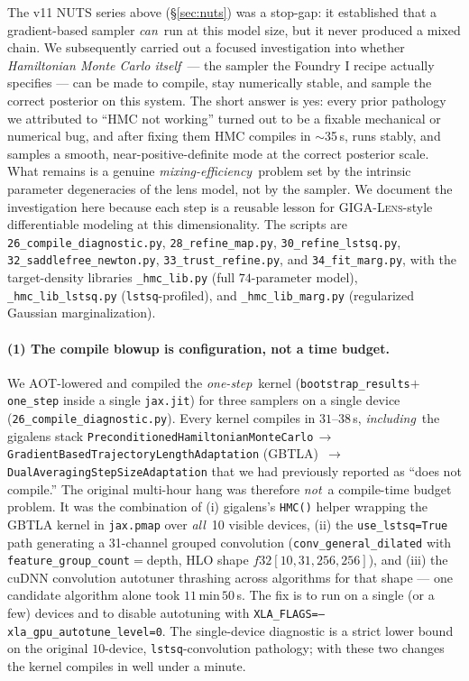 \documentclass[11pt,letterpaper]{article}
\newcommand{\gigalens}{\textsc{GIGA-Lens}}
\begin{document}
The v11 NUTS series above (\S\ref{sec:nuts}) was a stop-gap: it
established that a gradient-based sampler {\it can}\ run at this model
size, but it never produced a mixed chain. We subsequently carried out
a focused investigation into whether {\it Hamiltonian Monte Carlo
itself}\ --- the sampler the Foundry I recipe actually specifies --- can
be made to compile, stay numerically stable, and sample the correct
posterior on this system. The short answer is yes: every prior pathology
we attributed to ``HMC not working'' turned out to be a fixable
mechanical or numerical bug, and after fixing them HMC compiles in
$\sim$35\,s, runs stably, and samples a smooth, near-positive-definite
mode at the correct posterior scale. What remains is a genuine
{\it mixing-efficiency}\ problem set by the intrinsic parameter
degeneracies of the lens model, not by the sampler. We document the
investigation here because each step is a reusable lesson for
\gigalens-style differentiable modeling at this dimensionality. The
scripts are \texttt{26\_compile\_diagnostic.py},
\texttt{28\_refine\_map.py}, \texttt{30\_refine\_lstsq.py},
\texttt{32\_saddlefree\_newton.py}, \texttt{33\_trust\_refine.py}, and
\texttt{34\_fit\_marg.py}, with the target-density libraries
\texttt{\_hmc\_lib.py} (full $74$-parameter model),
\texttt{\_hmc\_lib\_lstsq.py} (\texttt{lstsq}-profiled), and
\texttt{\_hmc\_lib\_marg.py} (regularized Gaussian marginalization).

\paragraph{(1) The compile blowup is configuration, not a time budget.}
We AOT-lowered and compiled the {\it one-step}\ kernel
(\texttt{bootstrap\_results}$+$\texttt{one\_step} inside a single
\texttt{jax.jit}) for three samplers on a single device
(\texttt{26\_compile\_diagnostic.py}). Every kernel compiles in
$31$--$38$\,s, {\it including}\ the gigalens stack
\texttt{Preconditioned\-Hamiltonian\-Monte\-Carlo}$\,\to\,$
\texttt{Gradient\-Based\-Tra\-jec\-tory\-Length\-Adap\-ta\-tion} (GBTLA)
$\,\to\,$\texttt{DualAveragingStepSizeAdaptation} that we had previously
reported as ``does not compile.'' The original multi-hour hang was
therefore {\it not}\ a compile-time budget problem. It was the
combination of (i) gigalens's \texttt{HMC()} helper wrapping the GBTLA
kernel in \texttt{jax.pmap} over {\it all}\ 10 visible devices, (ii) the
\texttt{use\_lstsq=True} path generating a 31-channel grouped
convolution (\texttt{conv\_general\_dilated} with
\texttt{feature\_group\_count}$=$depth, HLO shape
$f32[10,31,256,256]$), and (iii) the cuDNN convolution autotuner
thrashing across algorithms for that shape --- one candidate algorithm
alone took $11$\,min\,$50$\,s. The fix is to run on a single (or a few)
devices and to disable autotuning with
\texttt{XLA\_FLAGS=--xla\_gpu\_autotune\_level=0}. The single-device
diagnostic is a strict lower bound on the original $10$-device,
\texttt{lstsq}-convolution pathology; with these two changes the kernel
compiles in well under a minute.
\end{document}
